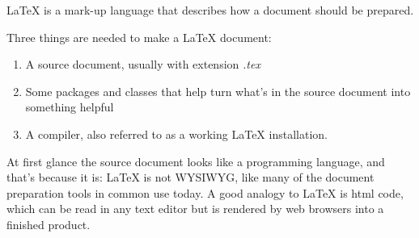 LaTeX is a mark-up language that describes how a document should be prepared.

Three things are needed to make a LaTeX document:
\begin{enumerate}
\item A source document, usually with extension \emph{.tex}
\item Some packages and classes that help turn what's in the source document into something helpful
\item A compiler, also referred to as a working LaTeX installation.
\end{enumerate}

At first glance the source document looks like a programming language, and that's because it is: LaTeX is not WYSIWYG, like many of the document preparation tools in common use today. A good analogy to LaTeX is html code, which can be read in any text editor but is rendered by web browsers into a finished product.
